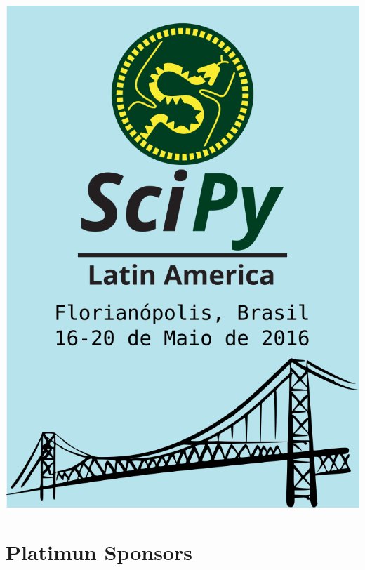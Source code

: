 \documentclass[12pt]{article}
\begin{document}
\thispagestyle{empty}
\noindent  %
\includegraphics{capa}
\NoBgThispage

\clearpage

\restoregeometry

\newpage



\newpage



\newpage

\section*{Platimun Sponsors}
\begin{minipage}{0.4\textwidth}

\end{minipage}
\hfill
\begin{minipage}{0.4\textwidth}

\end{minipage}
\end{document}
